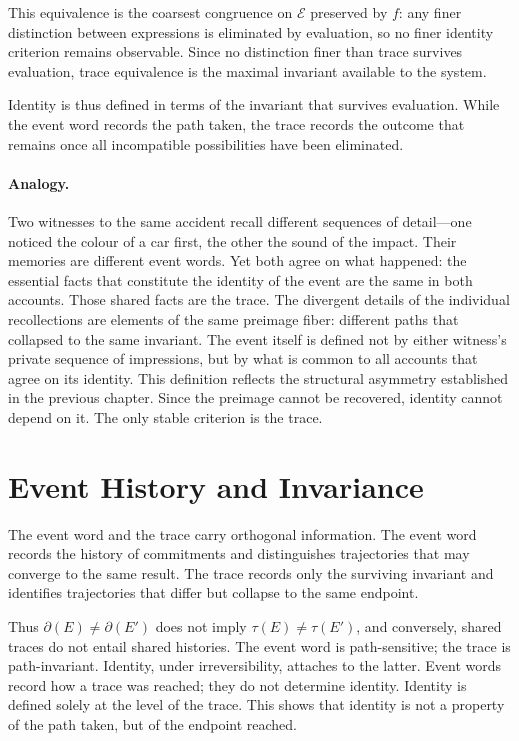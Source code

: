 \documentclass[12pt, oneside]{amsbook}
\theoremstyle{plain}
\theoremstyle{definition}
\theoremstyle{remark}
\newcommand{\Expr}{\mathcal{E}}
\newcommand{\evalf}{f}
\newcommand{\trace}{\tau}
\newcommand{\eventword}{\partial}
\begin{document}
This equivalence is the coarsest congruence on $\Expr$ preserved by $\evalf$:
any finer distinction between expressions is eliminated by evaluation, so no
finer identity criterion remains observable. Since no distinction finer than
trace survives evaluation, trace equivalence is the maximal invariant available
to the system.

Identity is thus defined in terms of the invariant that survives evaluation.
While the event word records the path taken, the trace records the outcome that
remains once all incompatible possibilities have been eliminated.

\paragraph{Analogy.}
Two witnesses to the same accident recall different sequences of detail---one noticed the colour of a car first, the other the sound of the impact. Their memories are different event words. Yet both agree on what happened: the essential facts that constitute the identity of the event are the same in both accounts. Those shared facts are the trace. The divergent details of the individual recollections are elements of the same preimage fiber: different paths that collapsed to the same invariant. The event itself is defined not by either witness's private sequence of impressions, but by what is common to all accounts that agree on its identity. This definition
reflects the structural asymmetry established in the previous chapter. Since the
preimage cannot be recovered, identity cannot depend on it. The only stable
criterion is the trace.

\section{Event History and Invariance}
\label{sec:identity:history}

The event word and the trace carry orthogonal information. The event word records
the history of commitments and distinguishes trajectories that may converge to
the same result. The trace records only the surviving invariant and identifies
trajectories that differ but collapse to the same endpoint.

Thus $\eventword(E) \neq \eventword(E')$ does not imply $\trace(E) \neq
\trace(E')$, and conversely, shared traces do not entail shared histories. The
event word is path-sensitive; the trace is path-invariant. Identity, under
irreversibility, attaches to the latter. Event words record how a trace was
reached; they do not determine identity. Identity is defined solely at the
level of the trace. This shows that identity is not a
property of the path taken, but of the endpoint reached.
\end{document}
